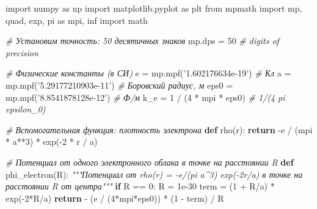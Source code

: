 \documentclass[11pt]{article}
\newenvironment{Shaded}{}{}
\newcommand{\KeywordTok}[1]{\textcolor[rgb]{0.00,0.44,0.13}{\textbf{{#1}}}}
\newcommand{\DecValTok}[1]{\textcolor[rgb]{0.25,0.63,0.44}{{#1}}}
\newcommand{\FloatTok}[1]{\textcolor[rgb]{0.25,0.63,0.44}{{#1}}}
\newcommand{\StringTok}[1]{\textcolor[rgb]{0.25,0.44,0.63}{{#1}}}
\newcommand{\CommentTok}[1]{\textcolor[rgb]{0.38,0.63,0.69}{\textit{{#1}}}}
\newcommand{\NormalTok}[1]{{#1}}
\newcommand{\ImportTok}[1]{{#1}}
\newcommand{\ControlFlowTok}[1]{\textcolor[rgb]{0.00,0.44,0.13}{\textbf{{#1}}}}
\newcommand{\OperatorTok}[1]{\textcolor[rgb]{0.40,0.40,0.40}{{#1}}}
\begin{document}
\begin{Shaded}
\begin{Highlighting}[]
\ImportTok{import}\NormalTok{ numpy }\ImportTok{as}\NormalTok{ np}
\ImportTok{import}\NormalTok{ matplotlib.pyplot }\ImportTok{as}\NormalTok{ plt}
\ImportTok{from}\NormalTok{ mpmath }\ImportTok{import}\NormalTok{ mp, quad, exp, pi }\ImportTok{as}\NormalTok{ mpi, inf}
\ImportTok{import}\NormalTok{ math}

\CommentTok{# Установим точность: 50 десятичных знаков}
\NormalTok{mp.dps }\OperatorTok{=} \DecValTok{50}  \CommentTok{# digits of precision}

\CommentTok{# Физические константы (в СИ)}
\NormalTok{e }\OperatorTok{=}\NormalTok{ mp.mpf(}\StringTok{'1.602176634e-19'}\NormalTok{)           }\CommentTok{# Кл}
\NormalTok{a }\OperatorTok{=}\NormalTok{ mp.mpf(}\StringTok{'5.29177210903e-11'}\NormalTok{)         }\CommentTok{# Боровский радиус, м}
\NormalTok{eps0 }\OperatorTok{=}\NormalTok{ mp.mpf(}\StringTok{'8.8541878128e-12'}\NormalTok{)       }\CommentTok{# Ф/м}
\NormalTok{k_e }\OperatorTok{=} \DecValTok{1} \OperatorTok{/}\NormalTok{ (}\DecValTok{4} \OperatorTok{*}\NormalTok{ mpi }\OperatorTok{*}\NormalTok{ eps0)              }\CommentTok{# 1/(4 pi epsilon_0)}

\CommentTok{# Вспомогательная функция: плотность электрона}
\KeywordTok{def}\NormalTok{ rho(r):}
    \ControlFlowTok{return} \OperatorTok{-}\NormalTok{e }\OperatorTok{/}\NormalTok{ (mpi }\OperatorTok{*}\NormalTok{ a}\OperatorTok{**}\DecValTok{3}\NormalTok{) }\OperatorTok{*}\NormalTok{ exp(}\OperatorTok{-}\DecValTok{2} \OperatorTok{*}\NormalTok{ r }\OperatorTok{/}\NormalTok{ a)}

\CommentTok{# Потенциал от одного электронного облака в точке на расстоянии R}
\KeywordTok{def}\NormalTok{ phi_electron(R):}
    \CommentTok{"""Потенциал от rho(r) = -e/(pi a^3) exp(-2r/a) в точке на расстоянии R от центра"""}
    \ControlFlowTok{if}\NormalTok{ R }\OperatorTok{==} \DecValTok{0}\NormalTok{:}
\NormalTok{        R }\OperatorTok{=} \FloatTok{1e-30}
\NormalTok{    term }\OperatorTok{=}\NormalTok{ (}\DecValTok{1} \OperatorTok{+}\NormalTok{ R}\OperatorTok{/}\NormalTok{a) }\OperatorTok{*}\NormalTok{ exp(}\OperatorTok{-}\DecValTok{2}\OperatorTok{*}\NormalTok{R}\OperatorTok{/}\NormalTok{a)}
    \ControlFlowTok{return} \OperatorTok{-}\NormalTok{ (e }\OperatorTok{/}\NormalTok{ (}\DecValTok{4}\OperatorTok{*}\NormalTok{mpi}\OperatorTok{*}\NormalTok{eps0)) }\OperatorTok{*}\NormalTok{ (}\DecValTok{1} \OperatorTok{-}\NormalTok{ term) }\OperatorTok{/}\NormalTok{ R}


\end{Highlighting}
\end{Shaded}
\end{document}
